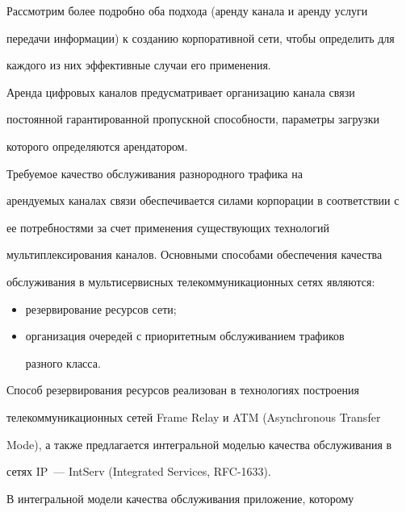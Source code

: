       Рассмотрим более подробно оба подхода (аренду канала и аренду услуги 


передачи информации)  к созданию корпоративной сети, чтобы определить для 


каждого из них эффективные случаи его применения.


      


      Аренда цифровых каналов предусматривает организацию канала связи 


постоянной гарантированной пропускной способности, параметры загрузки 


которого определяются арендатором. 


      


      Требуемое качество обслуживания разнородного трафика на 


арендуемых каналах связи обеспечивается силами корпорации в соответствии с 


ее потребностями за счет применения существующих технологий 


мультиплексирования каналов. Основными способами обеспечения качества 


обслуживания в мультисервисных телекоммуникационных сетях являются:


      \begin{itemize}


      \item резервирование ресурсов сети;


      \item организация очередей с приоритетным обслуживанием трафиков 


разного класса.


      \end{itemize}


      


      Способ резервирования ресурсов реализован в технологиях построения 


телекоммуникационных сетей Frame Relay и ATM (Asynchronous Transfer 


Mode), а так\-же предлагается интегральной моделью качества обслуживания в 


сетях IP~--- IntServ (Integrated Services, RFC-1633).


      


      В интегральной модели качества обслуживания приложение, которому 


